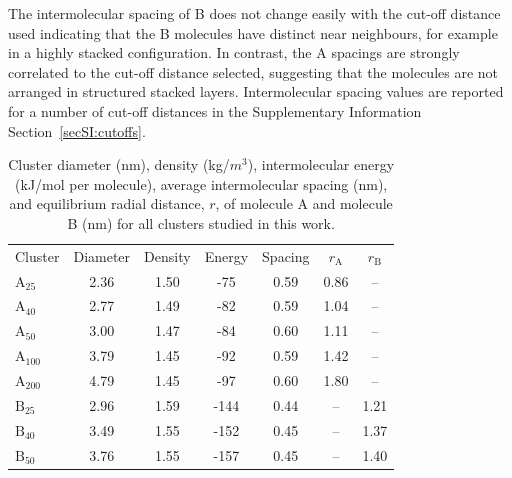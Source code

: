 The intermolecular spacing of B does not change easily with the cut-off distance used indicating that the B molecules have distinct near neighbours, for example in a highly stacked configuration. In contrast, the A spacings are strongly correlated to the cut-off distance selected, suggesting that the molecules are not arranged in structured stacked layers. Intermolecular spacing values are reported for a number of cut-off distances in the Supplementary Information Section~\ref{secSI:cutoffs}.
%
\begin{table}[ht]
\centering
\caption{Cluster diameter (nm), density (kg/$m^3$), intermolecular energy (kJ/mol per molecule), average intermolecular spacing (nm), and equilibrium radial distance, $r$, of molecule A and molecule B (nm) for all clusters studied in this work.} %
\label{table:maintable}
\begin{tabular}{lcccccc}
\hline
\multicolumn{1}{l}{\multirow{2}{*}{Cluster}} & \multicolumn{1}{c}{\multirow{2}{*}{Diameter}} & \multicolumn{1}{c}{\multirow{2}{*}{Density}} & \multicolumn{1}{c}{\multirow{2}{*}{Energy}} & \multicolumn{1}{c}{\multirow{2}{*}{Spacing}} & \multicolumn{1}{c}{\multirow{2}{*}{$r_{\text{A}}$}} & 
\multicolumn{1}{c}{\multirow{2}{*}{$r_{\text{B}}$}} \\ 
\multicolumn{1}{c}{} & \multicolumn{1}{c}{} & \multicolumn{1}{c}{} & \multicolumn{1}{c}{} & \multicolumn{1}{c}{} & \multicolumn{1}{c}{} & \multicolumn{1}{c}{} \\ \hline
$\text{A}_{\text{25}}$ & 2.36 & 1.50 & -75 & 0.59 &  \multicolumn{1}{c}{0.86} & -- \\
$\text{A}_{\text{40}}$ & 2.77 & 1.49 & -82 & 0.59 &  \multicolumn{1}{c}{1.04} & -- \\
$\text{A}_{\text{50}}$ & 3.00 & 1.47 & -84 & 0.60 &  \multicolumn{1}{c}{1.11} & -- \\
$\text{A}_{\text{100}}$ & 3.79 & 1.45 & -92 & 0.59 &  \multicolumn{1}{c}{1.42} & -- \\
$\text{A}_{\text{200}}$ & 4.79 & 1.45 & -97 & 0.60 &  \multicolumn{1}{c}{1.80} & -- \\ \hline
$\text{B}_{\text{25}}$ & 2.96 & 1.59 & -144 & 0.44 &  \multicolumn{1}{c}{--} & 1.21 \\
$\text{B}_{\text{40}}$ & 3.49 & 1.55 & -152 & 0.45 &  \multicolumn{1}{c}{--} & 1.37 \\
$\text{B}_{\text{50}}$ & 3.76 & 1.55 & -157 & 0.45 &  \multicolumn{1}{c}{--} & 1.40 \\

\end{tabular}
\end{table}
